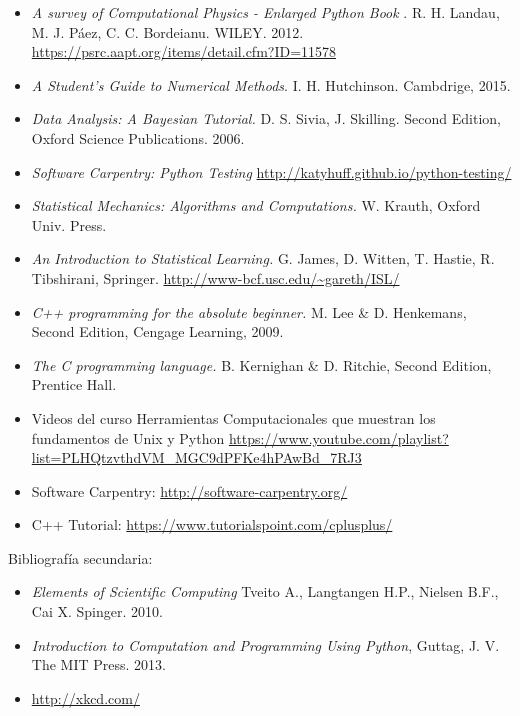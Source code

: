 \documentclass[letterpaper,10pt,onecolumn]{article}
\begin{document}
\begin{itemize}


\item
\textit{A survey of Computational Physics - Enlarged Python Book}
. R. H. Landau, M. J. P\'aez, C. C. Bordeianu. WILEY. 2012.
\url{https://psrc.aapt.org/items/detail.cfm?ID=11578}

\item 
\textit{A Student's Guide to Numerical
  Methods}. I. H. Hutchinson. Cambdrige, 2015.


\item
\textit{Data Analysis: A Bayesian Tutorial.} D. S. Sivia,
J. Skilling. Second Edition, Oxford Science Publications. 2006.

\item
\textit{Software Carpentry: Python Testing}
\url{http://katyhuff.github.io/python-testing/}

\item 
\textit{Statistical Mechanics: Algorithms and Computations.}
W. Krauth, Oxford Univ. Press. 

\item
\textit{An Introduction to Statistical Learning.} G. James, D. Witten,
T. Hastie, R. Tibshirani,
Springer. \url{http://www-bcf.usc.edu/~gareth/ISL/} 

\item
\textit{C++ programming for the absolute beginner.}
 M. Lee \& D. Henkemans, Second Edition, Cengage Learning, 2009.

\item
\textit{The C programming language.}
 B. Kernighan \& D. Ritchie, Second Edition, Prentice Hall.

\item Videos del curso Herramientas Computacionales que muestran los
  fundamentos de Unix y Python \url{https://www.youtube.com/playlist?list=PLHQtzvthdVM_MGC9dPFKe4hPAwBd_7RJ3}

\item Software Carpentry: \url{http://software-carpentry.org/}
\item C++ Tutorial: \url{https://www.tutorialspoint.com/cplusplus/}
\end{itemize}

\noindent\normalsize Bibliograf\'ia secundaria:
\begin{itemize}
\item
\textit{Elements of Scientific Computing}
Tveito A., Langtangen H.P., Nielsen B.F., Cai X. Spinger. 2010.


\item 
\textit{Introduction to Computation and Programming Using Python},
Guttag, J. V. The MIT Press. 2013.

\item\url{http://xkcd.com/}
\end{itemize}
\end{document}
